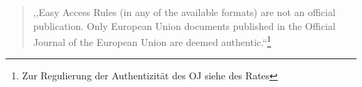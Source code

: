     \begin{quote}
        ,,Easy Access Rules (in any of the available formats) are not an official publication. Only European Union documents published in the Official Journal of the European Union are deemed authentic.``\footnote{Zur Regulierung der Authentizität des \ac{OJ} siehe  des Rates} \cite{easa_xml_export}
    \end{quote}
        
     